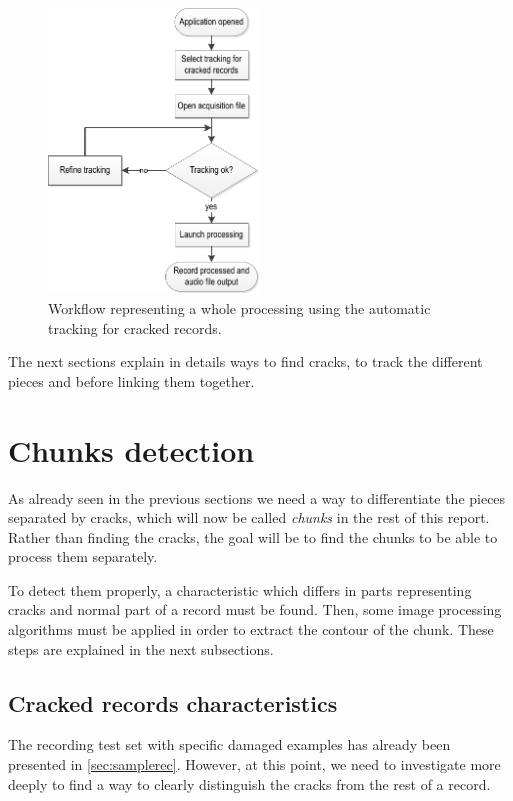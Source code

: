 \begin{figure}[!ht]
\centering
\includegraphics[width=0.5\textwidth]{images/auto-track-flow}
\caption[Workflow representing a whole processing using the automatic tracking.]
{Workflow representing a whole processing using the automatic tracking for cracked records.}
\label{fig:autotrackflow}
\end{figure}

The next sections explain in details ways to find cracks, to track the different pieces and before linking them together.

\section{Chunks detection}

As already seen in the previous sections we need a way to differentiate the pieces separated by cracks, which will now be called \emph{chunks} in the rest of this report. Rather than finding the cracks, the goal will be to find the chunks to be able to process them separately.

To detect them properly, a characteristic which differs in parts representing cracks and normal part of a record must be found. Then, some image processing algorithms must be applied in order to extract the contour of the chunk. These steps are explained in the next subsections.

\subsection{Cracked records characteristics}
\label{sec:crackrecchar}

The recording test set with specific damaged examples has already been presented in \autoref{sec:samplerec}. However, at this point, we need to investigate more deeply to find a way to clearly distinguish the cracks from the rest of a record.

